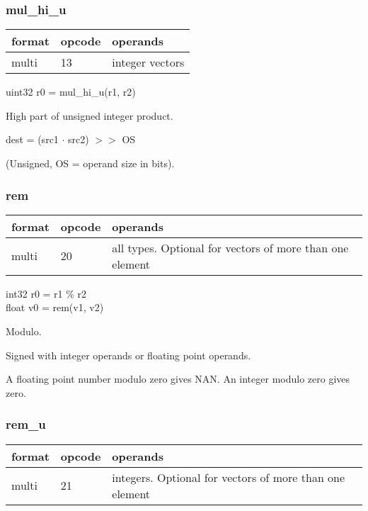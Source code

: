 \documentclass[forwardcom.tex]{subfiles}
\begin{document}
\subsubsection{mul\_hi\_u}
\label{table:mulHiUInstruction}
\begin{tabular}{|p{12mm}|p{12mm}|p{110mm}|}
\hline
\bfseries format & \bfseries opcode & \bfseries operands \\ \hline
multi & 13 & integer vectors \\ \hline
\end{tabular}
\vspace{2mm}

uint32 r0 = mul\_hi\_u(r1, r2)
\vspace{2mm}

High part of unsigned integer product.
\vspace{2mm}

dest = (src1 $\cdot$ src2) $>>$ OS

(Unsigned, OS = operand size in bits).


\subsubsection{rem}
\label{table:remInstruction}
\begin{tabular}{|p{12mm}|p{12mm}|p{110mm}|}
\hline
\bfseries format & \bfseries opcode & \bfseries operands \\ \hline
multi & 20 & all types. Optional for vectors of more than one element \\ \hline
\end{tabular}
\vspace{2mm}

int32 r0 = r1 \% r2 \\
float v0 = rem(v1, v2)
\vspace{2mm}

Modulo. 

\vspace{2mm}
Signed with integer operands or floating point operands.

\vspace{2mm}
A floating point number modulo zero gives NAN.
An integer modulo zero gives zero.

\subsubsection{rem\_u}
\label{table:remUInstruction}
\begin{tabular}{|p{12mm}|p{12mm}|p{110mm}|}
\hline
\bfseries format & \bfseries opcode & \bfseries operands \\ \hline
multi & 21 & integers. Optional for vectors of more than one element \\ \hline
\end{tabular}
\vspace{2mm}
\end{document}
